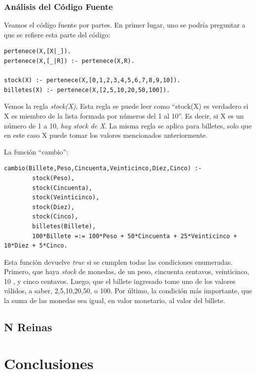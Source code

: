 \documentclass[12pt,titlepage]{article}
\begin{document}
\subsubsection{Análisis del Código Fuente}

Veamos el código fuente por partes. En primer lugar, uno se podría preguntar a que se refiere esta parte del código:
\begin{lstlisting}
pertenece(X,[X|_]).
pertenece(X,[_|R]) :- pertenece(X,R).

stock(X) :- pertenece(X,[0,1,2,3,4,5,6,7,8,9,10]).
billetes(X) :- pertenece(X,[2,5,10,20,50,100]).
\end{lstlisting}

Vemos la regla \textit{stock(X)}. Esta regla se puede leer como ``stock(X) es verdadero si X es miembro de la lista formada por números del 1 al 10''. Es decir, si X es un número de 1 a 10, \textit{hay stock de X}. La misma regla se aplica para billetes, solo que en este caso X puede tomar los valores mencionados anteriormente.

La función ``cambio'':

\begin{lstlisting}
cambio(Billete,Peso,Cincuenta,Veinticinco,Diez,Cinco) :-
        stock(Peso),
        stock(Cincuenta),
        stock(Veinticinco),
        stock(Diez),
        stock(Cinco),
        billetes(Billete),
        100*Billete =:= 100*Peso + 50*Cincuenta + 25*Veinticinco + 10*Diez + 5*Cinco.
\end{lstlisting}

Esta función devuelve \textit{true} si se cumplen todas las condiciones enumeradas. Primero, que haya \textit{stock} de monedas, de un peso, cincuenta centavos, veinticinco, 10 , y cinco centavos. Luego, que el billete ingresado tome uno de los valores válidos, a saber, 2,5,10,20,50, o 100. Por último, la condición más importante, que la suma de las monedas sea igual, en valor monetario, al valor del billete.

\subsection{N Reinas}

\newpage
\section{Conclusiones}
\end{document}
